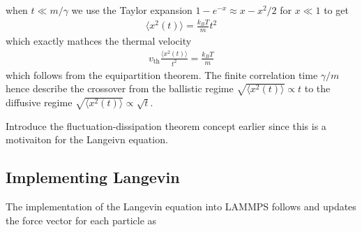 when $t \ll m/\gamma$ we use the Taylor expansion $1 - e^{-x} \approx x - x^2/2$
for $x\ll 1$ to get 
\begin{align*}
  \big\langle x^2(t) \big\rangle = \frac{k_B T}{m} t^2
\end{align*}
which exactly mathces the thermal velocity
\begin{align*}
  v_{\text{th}} \frac{\big\langle x^2(t) \big\rangle}{t^2} = \frac{k_B T}{m}
\end{align*}
which follows from the equipartition theorem. The finite correlation time
$\gamma/m$ hence describe the crossover from the ballistic regime $\sqrt{\langle
x^2(t) \rangle} \propto t$ to the diffusive regime $\sqrt{\langle x^2(t)
\rangle} \propto \sqrt{t}$.

Introduce the fluctuation-dissipation theorem concept earlier since this is a
motivaiton for the Langeivn equation. 



\subsection{Implementing Langevin}






The implementation of the Langevin equation into LAMMPS follows
\cite{PhysRevB.17.1302} and updates the force vector for each particle as 

